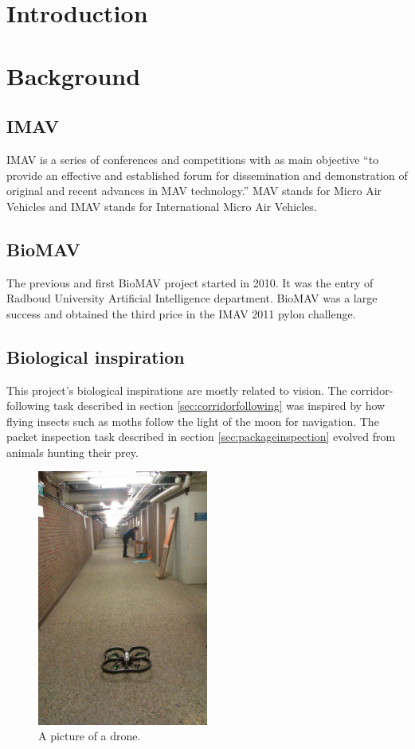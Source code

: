 \documentclass[a4paper,10pt]{article}
\begin{document}
\section{Introduction}
\section{Background}
\label{sec:background}
\subsection{IMAV}
IMAV is a series of conferences and competitions with as main objective
``to provide an effective and established forum for dissemination and
demonstration of original and recent advances in MAV technology.''\cite{imav}
MAV stands for Micro Air Vehicles and IMAV stands for International
Micro Air Vehicles.

\subsection{BioMAV}
The previous and first BioMAV project started in 2010. It was the entry
of Radboud University Artificial Intelligence department. BioMAV was a large
success and obtained the third price in the IMAV 2011 pylon challenge.

\subsection{Biological inspiration}
This project's biological inspirations are mostly related to vision. The
corridor-following task described in section \ref{sec:corridorfollowing} was inspired by how flying insects such as moths
follow the light of the moon for navigation. The packet inspection task described in section \ref{sec:packageinspection}
evolved from animals hunting their prey.
\begin{figure}[h!]
	\caption{A picture of a drone.}
	\centering
	\includegraphics[width=0.5\textwidth]{images/boringHallway}
\end{figure}
\end{document}
